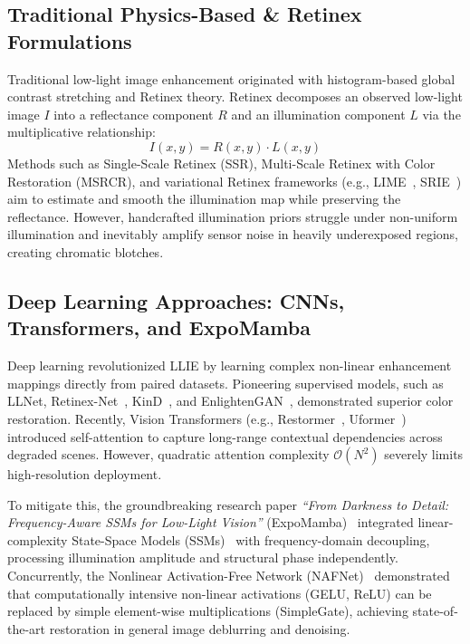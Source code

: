 \documentclass[journal,onecolumn,11pt]{IEEEtran}
\begin{document}
\subsection{Traditional Physics-Based \& Retinex Formulations}
Traditional low-light image enhancement originated with histogram-based global contrast stretching and Retinex theory. Retinex decomposes an observed low-light image $I$ into a reflectance component $R$ and an illumination component $L$ via the multiplicative relationship:
\begin{equation}
I(x, y) = R(x, y) \cdot L(x, y)
\end{equation}
Methods such as Single-Scale Retinex (SSR), Multi-Scale Retinex with Color Restoration (MSRCR), and variational Retinex frameworks (e.g., LIME~\cite{guo2017lime}, SRIE~\cite{fu2016weighted}) aim to estimate and smooth the illumination map while preserving the reflectance. However, handcrafted illumination priors struggle under non-uniform illumination and inevitably amplify sensor noise in heavily underexposed regions, creating chromatic blotches.

\subsection{Deep Learning Approaches: CNNs, Transformers, and ExpoMamba}
Deep learning revolutionized LLIE by learning complex non-linear enhancement mappings directly from paired datasets. Pioneering supervised models, such as LLNet, Retinex-Net~\cite{wei2018deep}, KinD~\cite{zhang2019kindling}, and EnlightenGAN~\cite{jiang2021enlightengan}, demonstrated superior color restoration. Recently, Vision Transformers (e.g., Restormer~\cite{zamir2022restormer}, Uformer~\cite{wang2022uformer}) introduced self-attention to capture long-range contextual dependencies across degraded scenes. However, quadratic attention complexity $\mathcal{O}(N^2)$ severely limits high-resolution deployment. 

To mitigate this, the groundbreaking research paper \textit{``From Darkness to Detail: Frequency-Aware SSMs for Low-Light Vision''} (ExpoMamba)~\cite{adhikarla2025darkness} integrated linear-complexity State-Space Models (SSMs)~\cite{gu2023mamba} with frequency-domain decoupling, processing illumination amplitude and structural phase independently. Concurrently, the Nonlinear Activation-Free Network (NAFNet)~\cite{chen2022simple} demonstrated that computationally intensive non-linear activations (GELU, ReLU) can be replaced by simple element-wise multiplications (SimpleGate), achieving state-of-the-art restoration in general image deblurring and denoising.
\end{document}
